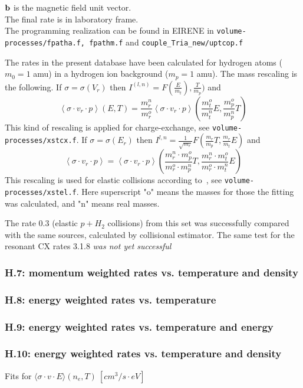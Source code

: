 \documentclass[12pt,dvips]{article}
\begin{document}
${\bf b}$ is the magnetic field unit vector.\\
The final rate is in laboratory frame.\\
The programming realization can be found in EIRENE in {\tt volume-processes/fpatha.f, fpathm.f} and {\tt couple\_Tria\_new/uptcop.f}

The rates in the present database have been calculated for hydrogen atoms ($m_0=1$ amu) in a hydrogen ion background ($m_p=1$ amu). The mass rescaling is the following.
If $\sigma=\sigma(V_r)$ then $I^{(l,n)}=F\left(\frac{E}{m_t}\right),\frac{T}{m_p})$ and
$$\left<\sigma\cdot v_r\cdot p\right>(E,T)=\frac{m^n_r}{m^o_r}
\left<\sigma\cdot v_r\cdot p\right>(\frac{m^o_t}{m^n_t}E,\frac{m^o_p}{m^n_p}T)$$
This kind of rescaling is applied for charge-exchange, see {\tt volume-processes/xstcx.f}.
If $\sigma=\sigma(E_r)$ then $I^{l,n}=\frac{1}{\sqrt{m_r}}F\left(\frac{m_r}{m_p}T, \frac{m_r}{m_t}E\right)$ and
$$\left<\sigma\cdot v_r\cdot p\right>=\left<\sigma\cdot v_r\cdot p\right>\left(\frac{m^n_r\cdot m^o_p}{m^o_r\cdot m^n_p}T,\frac{m^n_r\cdot m^o_t}{m^o_r\cdot m^n_t}E\right)$$
This rescaling is used for elastic collisions according to~\cite{kn:OakRidge}, see {\tt volume-processes/xstel.f}. Here superscript "o" means the masses for those the fitting was calculated, and "n" means real masses.

The rate 0.3 (elastic $p+H_2$ collisions) from this set was successfully compared with the same sources, calculated by collisional estimator. The same test for the resonant CX rates 3.1.8  {\em was not yet successful}
\subsubsection*{H.7: momentum weighted rates vs. temperature and density}
\subsubsection*{H.8: energy weighted rates vs. temperature}
\subsubsection*{H.9: energy weighted rates vs. temperature and energy}
\subsubsection*{H.10: energy weighted rates vs. temperature and density}
Fits for $\langle\sigma \cdot v \cdot E \rangle (n_e,T) \ [cm^3/s \cdot eV]$
\end{document}
